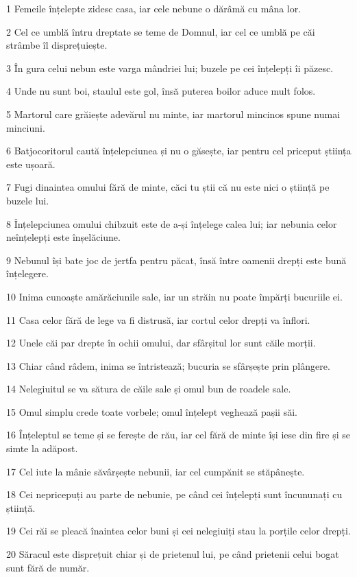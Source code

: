 \par 1 Femeile înțelepte zidesc casa, iar cele nebune o dărâmă cu mâna lor.
\par 2 Cel ce umblă întru dreptate se teme de Domnul, iar cel ce umblă pe căi strâmbe îl disprețuiește.
\par 3 În gura celui nebun este varga mândriei lui; buzele pe cei înțelepți îi păzesc.
\par 4 Unde nu sunt boi, staulul este gol, însă puterea boilor aduce mult folos.
\par 5 Martorul care grăiește adevărul nu minte, iar martorul mincinos spune numai minciuni.
\par 6 Batjocoritorul caută înțelepciunea și nu o găsește, iar pentru cel priceput știința este ușoară.
\par 7 Fugi dinaintea omului fără de minte, căci tu știi că nu este nici o știință pe buzele lui.
\par 8 Înțelepciunea omului chibzuit este de a-și înțelege calea lui; iar nebunia celor neînțelepți este înșelăciune.
\par 9 Nebunul își bate joc de jertfa pentru păcat, însă între oamenii drepți este bună înțelegere.
\par 10 Inima cunoaște amărăciunile sale, iar un străin nu poate împărți bucuriile ei.
\par 11 Casa celor fără de lege va fi distrusă, iar cortul celor drepți va înflori.
\par 12 Unele căi par drepte în ochii omului, dar sfârșitul lor sunt căile morții.
\par 13 Chiar când râdem, inima se întristează; bucuria se sfârșește prin plângere.
\par 14 Nelegiuitul se va sătura de căile sale și omul bun de roadele sale.
\par 15 Omul simplu crede toate vorbele; omul înțelept veghează pașii săi.
\par 16 Înțeleptul se teme și se ferește de rău, iar cel fără de minte își iese din fire și se simte la adăpost.
\par 17 Cel iute la mânie săvârșește nebunii, iar cel cumpănit se stăpânește.
\par 18 Cei nepricepuți au parte de nebunie, pe când cei înțelepți sunt încununați cu știință.
\par 19 Cei răi se pleacă înaintea celor buni și cei nelegiuiți stau la porțile celor drepți.
\par 20 Săracul este disprețuit chiar și de prietenul lui, pe când prietenii celui bogat sunt fără de număr.
